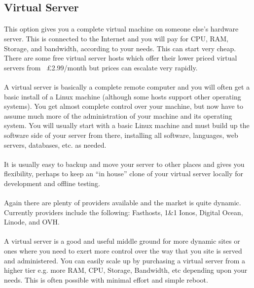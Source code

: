 \subsection{Virtual Server}
\paragraph{} This option gives you a complete virtual machine on someone else’s hardware server. This is connected to the Internet and you will pay for CPU, RAM, Storage, and bandwidth, according to your needs. This can start very cheap. There are some free virtual server hosts which offer their lower priced virtual servers from ~£2.99/month but prices can escalate very rapidly.
\paragraph{} A virtual server is basically a complete remote computer and you will often get a basic install of a Linux machine (although some hosts support other operating systems). You get almost complete control over your machine, but now have to assume much more of the administration of your machine and its operating system. You will usually start with a basic Linux machine and must build up the software side of your server from there, installing all software, languages, web servers, databases, etc. as needed.
\paragraph{} It is usually easy to backup and move your server to other places and gives you flexibility, perhaps to keep an ``in house'' clone of your virtual server locally for development and offline testing.
\paragraph{} Again there are plenty of providers available and the market is quite dynamic. Currently providers include the following: Fasthosts, 1\&1 Ionos, Digital Ocean, Linode, and OVH.
\paragraph{} A virtual server is a good and useful middle ground for more dynamic sites or ones where you need to exert more control over the way that you site is served and administered. You can easily scale up by purchasing a virtual server from a higher tier e.g. more RAM, CPU, Storage, Bandwidth, etc depending upon your needs. This is often possible with minimal effort and simple reboot.


